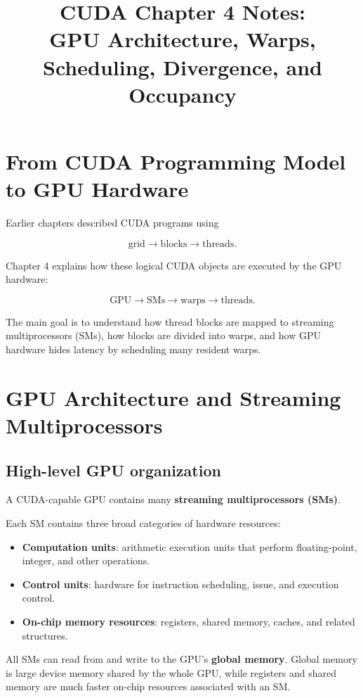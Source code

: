 \documentclass[11pt,a4paper]{article}
\title{CUDA Chapter 4 Notes:\\
GPU Architecture, Warps, Scheduling, Divergence, and Occupancy}
\author{}
\date{}
\begin{document}
\maketitle

\section{From CUDA Programming Model to GPU Hardware}

Earlier chapters described CUDA programs using

\[
\text{grid}
\rightarrow
\text{blocks}
\rightarrow
\text{threads}.
\]

Chapter 4 explains how these logical CUDA objects are executed by the GPU hardware:

\[
\text{GPU}
\rightarrow
\text{SMs}
\rightarrow
\text{warps}
\rightarrow
\text{threads}.
\]

The main goal is to understand how thread blocks are mapped to streaming multiprocessors (SMs), how blocks are divided into warps, and how GPU hardware hides latency by scheduling many resident warps.

\section{GPU Architecture and Streaming Multiprocessors}

\subsection{High-level GPU organization}

A CUDA-capable GPU contains many \textbf{streaming multiprocessors (SMs)}.

Each SM contains three broad categories of hardware resources:

\begin{itemize}
    \item \textbf{Computation units}: arithmetic execution units that perform floating-point, integer, and other operations.
    \item \textbf{Control units}: hardware for instruction scheduling, issue, and execution control.
    \item \textbf{On-chip memory resources}: registers, shared memory, caches, and related structures.
\end{itemize}

All SMs can read from and write to the GPU's \textbf{global memory}. Global memory is large device memory shared by the whole GPU, while registers and shared memory are much faster on-chip resources associated with an SM.
\end{document}
